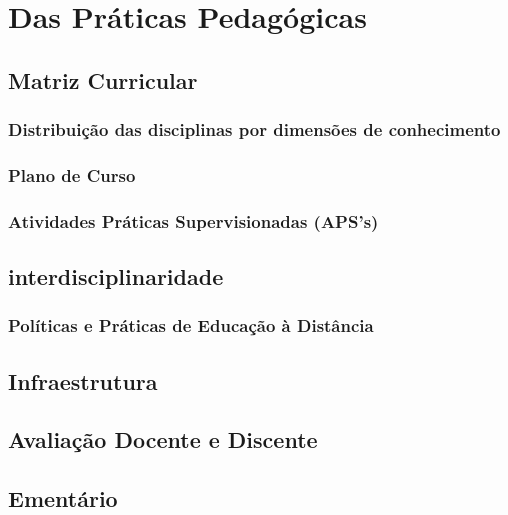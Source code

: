 \documentclass[a4paper, 12pt, openright, oneside, german, french, english, brazil]{abntex2}
\begin{document}
\part{Das Práticas Pedagógicas}

\chapter{Matriz Curricular}


\section{Distribuição das disciplinas por dimensões de conhecimento}


\section{Plano de Curso}

\section{Atividades Práticas Supervisionadas (APS's)}



\chapter{interdisciplinaridade}

\section{Políticas e Práticas de Educação à Distância}


\chapter{Infraestrutura}


\chapter{Avaliação Docente e Discente}


\chapter{Ementário}
\end{document}
